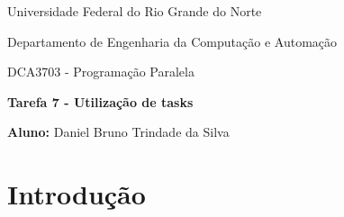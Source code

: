 \documentclass[a4paper, 12pt]{article}
\begin{document}
	\begin{center}
		Universidade Federal do Rio Grande do Norte
		
		Departamento de Engenharia da Computação e Automação
		
		DCA3703 - Programação Paralela
		
		\textbf{Tarefa 7 - Utilização de tasks}
		
		\textbf{Aluno:} Daniel Bruno Trindade da Silva
	\end{center}
	
	\section{Introdução}

	 
	
\end{document}
